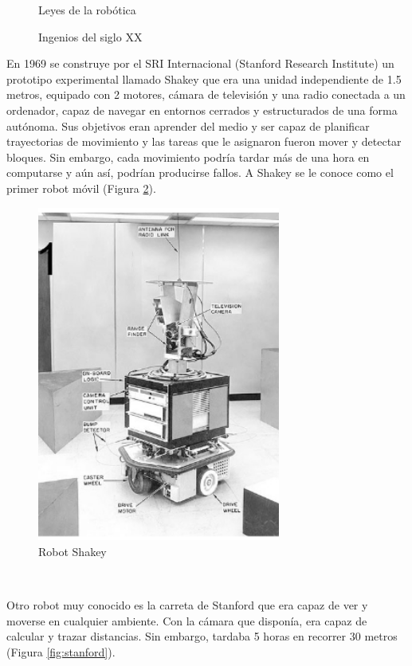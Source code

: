 \begin{figure}[ht!]
\begin{minipage}{0.3\linewidth}
		\caption*{\centering  Leyes de la robótica \cite{clarke1993asimov}}
	\end{minipage}
	\caption{Ingenios del siglo XX}
	\label{fig:sigloXX}
\end{figure}


En 1969 se construye por el SRI Internacional (Stanford Research Institute) un prototipo experimental llamado Shakey que era una unidad independiente de 1.5 metros, equipado con 2 motores, cámara de televisión y una radio conectada a un ordenador, capaz de navegar en entornos cerrados y estructurados de una forma autónoma. Sus objetivos eran aprender del medio y ser capaz de planificar trayectorias de movimiento y las tareas que le asignaron fueron mover y detectar bloques. Sin embargo, cada movimiento podría tardar más de una hora en computarse y aún así, podrían producirse fallos. A Shakey se le conoce como el primer robot móvil (Figura \ref{fig:shakey}). \\

\begin{figure} [h!]
	\begin{center}
		\includegraphics[width=8cm]{figs/shakey.png}
	\end{center}
	\caption{Robot Shakey \cite{nilsson1984shakey}}
	\label{fig:shakey}
\end{figure}\


Otro robot muy conocido es la carreta de Stanford que era capaz de ver y moverse en cualquier ambiente. Con la cámara que disponía, era capaz de calcular y trazar distancias. Sin embargo, tardaba 5 horas en recorrer 30 metros (Figura \ref{fig:stanford}). 

